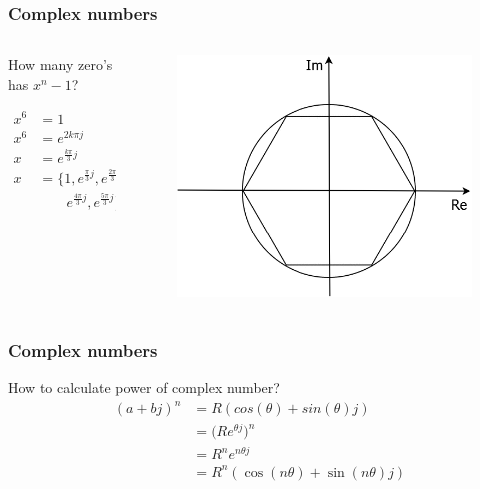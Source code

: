 \begin{frame}
\frametitle{Complex numbers}

	\begin{columns}
		\begin{column}{0.4\textwidth}
		\begin{block}{How many zero's has $x^n-1$?}
			\begin{center}
					\begin{align*}
					x^6 &=  1\\
					x^6 & = e^{2 k \pi j}\\
					x &= e^{\frac{k \pi}{3}j} \\
					x &= \{1,e^{\frac{\pi}{3}j},e^{\frac{2\pi}{3}j},-1,\\
					& \qquad  e^{\frac{4\pi}{3}j},e^{\frac{5\pi}{3}j}\}
					\end{align*}
			\end{center}
		\end{block}
		\end{column}
		\begin{column}{0.6 \textwidth}
			\begin{figure}
			\centering
		\includegraphics[width=1\linewidth]{Images/afbeelding5}

		\end{figure}

		\end{column}
	\end{columns}
\end{frame}
\begin{frame}
	\frametitle{Complex numbers}
	\begin{block}{How to calculate power of complex number?}
			\begin{align*}
				(a+b j)^n &=R (cos(\theta) + sin(\theta) j ) \\
				& = \big(Re^{\theta j}\big)^{n} \\
				& = R^n e^{n \theta j} \\
				& = R^n (\cos(n \theta) + \sin(n \theta)j) 
			\end{align*}
	\end{block}
\end{frame}
